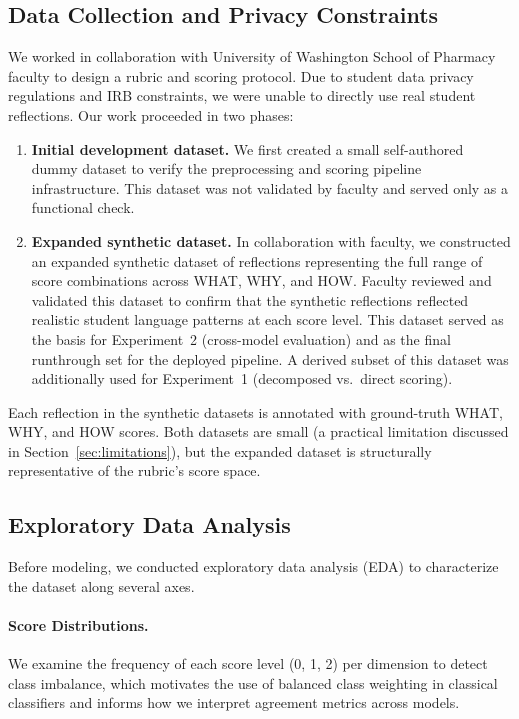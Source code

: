 \documentclass[11pt]{article}
\begin{document}
\subsection{Data Collection and Privacy Constraints}

We worked in collaboration with University of Washington School of Pharmacy faculty to design a rubric and scoring protocol. Due to student data privacy regulations and IRB constraints, we were unable to directly use real student reflections. Our work proceeded in two phases:

\begin{enumerate}
    \item \textbf{Initial development dataset.} We first created a small self-authored dummy dataset to verify the preprocessing and scoring pipeline infrastructure. This dataset was not validated by faculty and served only as a functional check.

    \item \textbf{Expanded synthetic dataset.} In collaboration with faculty, we constructed an expanded synthetic dataset of reflections representing the full range of score combinations across WHAT, WHY, and HOW. Faculty reviewed and validated this dataset to confirm that the synthetic reflections reflected realistic student language patterns at each score level. This dataset served as the basis for Experiment~2 (cross-model evaluation) and as the final runthrough set for the deployed pipeline. A derived subset of this dataset was additionally used for Experiment~1 (decomposed vs.\ direct scoring).
\end{enumerate}

Each reflection in the synthetic datasets is annotated with ground-truth WHAT, WHY, and HOW scores. Both datasets are small (a practical limitation discussed in Section~\ref{sec:limitations}), but the expanded dataset is structurally representative of the rubric's score space.

\subsection{Exploratory Data Analysis}

Before modeling, we conducted exploratory data analysis (EDA) to characterize the dataset along several axes.

\paragraph{Score Distributions.} We examine the frequency of each score level (0, 1, 2) per dimension to detect class imbalance, which motivates the use of balanced class weighting in classical classifiers and informs how we interpret agreement metrics across models.
\end{document}
